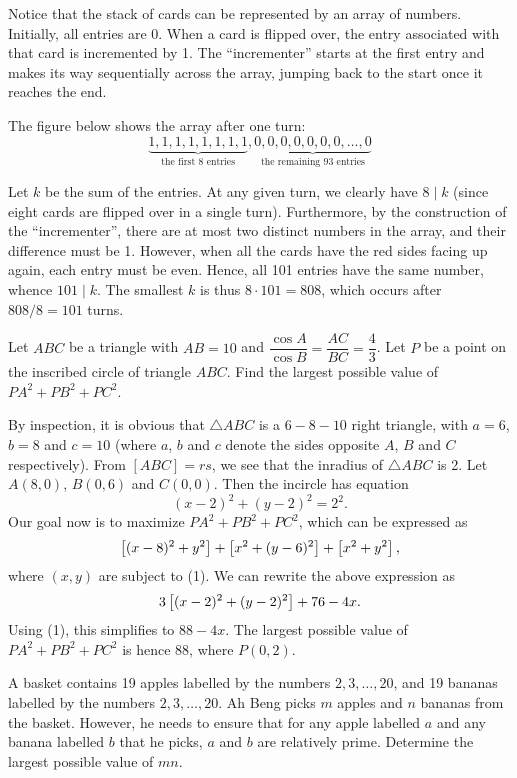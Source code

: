 Notice that the stack of cards can be represented by an array of numbers. Initially, all entries are 0. When a card is flipped over, the entry associated with that card is incremented by 1. The ``incrementer'' starts at the first entry and makes its way sequentially across the array, jumping back to the start once it reaches the end.

The figure below shows the array after one turn: \[\underbrace{1,1,1,1,1,1,1,1}_{\text{the first 8 entries}},\underbrace{0,0,0,0,0,0,0,\ldots,0}_{\text{the remaining 93 entries}}\]

Let $k$ be the sum of the entries. At any given turn, we clearly have $8 \mid k$ (since eight cards are flipped over in a single turn). Furthermore, by the construction of the ``incrementer'', there are at most two distinct numbers in the array, and their difference must be 1. However, when all the cards have the red sides facing up again, each entry must be even. Hence, all 101 entries have the same number, whence $101 \mid k$. The smallest $k$ is thus $8 \cdot 101 = 808$, which occurs after $808/8 = 101$ turns.

\begin{question}[88]\label{A::2021-O-1-18}
    Let $ABC$ be a triangle with $AB = 10$ and $\dfrac{\cos A}{\cos B} = \dfrac{AC}{BC} = \dfrac43$. Let $P$ be a point on the inscribed circle of triangle $ABC$. Find the largest possible value of $PA^2 + PB^2 + PC^2$.
\end{question}

By inspection, it is obvious that $\triangle ABC$ is a $6-8-10$ right triangle, with $a = 6$, $b = 8$ and $c = 10$ (where $a$, $b$ and $c$ denote the sides opposite $A$, $B$ and $C$ respectively). From $[ABC] = rs$, we see that the inradius of $\triangle ABC$ is 2. Let $A(8, 0)$, $B(0, 6)$ and $C(0, 0)$. Then the incircle has equation \[(x-2)^2 + (y-2)^2 = 2^2. \tag{1}\] Our goal now is to maximize $PA^2 + PB^2 + PC^2$, which can be expressed as \[\left[ (x-8)^2 + y^2 \right] + \left[ x^2 + (y-6)^2 \right] + \left[ x^2 + y^2 \right],\] where $(x, y)$ are subject to (1). We can rewrite the above expression as \[3\left[ (x-2)^2 + (y-2)^2 \right] + 76 - 4x.\] Using (1), this simplifies to $88 - 4x$. The largest possible value of $PA^2 + PB^2 + PC^2$ is hence 88, where $P(0, 2)$.

\begin{question}[65]\label{A::2021-O-1-19}
    A basket contains 19 apples labelled by the numbers $2, 3, \ldots, 20$, and 19 bananas labelled by the numbers $2, 3, \ldots, 20$. Ah Beng picks $m$ apples and $n$ bananas from the basket. However, he needs to ensure that for any apple labelled $a$ and any banana labelled $b$ that he picks, $a$ and $b$ are relatively prime. Determine the largest possible value of $mn$.
\end{question}


